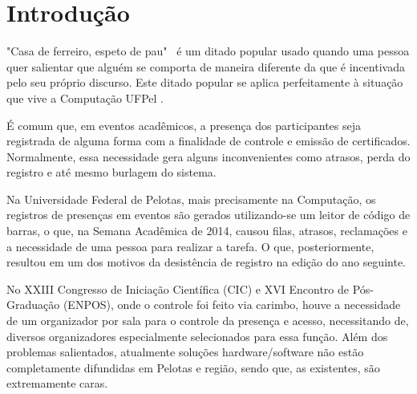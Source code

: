 \documentclass[tcc,capa]{texufpel}
\begin{document}
\listoftables


\tableofcontents

\chapter{Introdução}
    "Casa de ferreiro, espeto de pau"~  é um ditado popular usado quando uma pessoa quer salientar que alguém se comporta de maneira diferente da que é incentivada pelo seu próprio discurso. Este ditado popular se aplica perfeitamente à situação que vive a Computação UFPel \cite{schmidt2011instituto}.
    
    É comum que, em eventos acadêmicos, a presença dos participantes seja registrada de alguma forma com a finalidade de controle e emissão de certificados. Normalmente, essa necessidade gera alguns inconvenientes como atrasos, perda do registro e até mesmo burlagem do sistema.
    
    Na Universidade Federal de Pelotas, mais precisamente na Computação, os registros de presenças em eventos são gerados utilizando-se um leitor de código de barras, o que, na Semana Acadêmica de 2014, causou filas, atrasos, reclamações e a necessidade de uma pessoa para realizar a tarefa. O que, posteriormente, resultou em um dos motivos da desistência de registro na edição do ano seguinte.
    
    No XXIII Congresso de Iniciação Científica (CIC) e XVI Encontro de Pós-Graduação (ENPOS), onde o controle foi feito via carimbo, houve a necessidade de um organizador por sala para o controle da presença e acesso, necessitando de, diversos organizadores especialmente selecionados para essa função. Além dos problemas salientados, atualmente soluções hardware/software não estão completamente difundidas em Pelotas e região, sendo que, as existentes, são extremamente caras.
    
\end{document}

